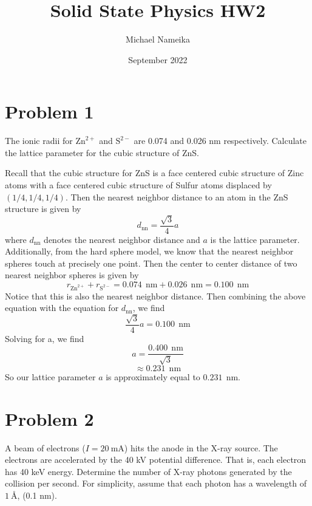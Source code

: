 \documentclass{article}
\title{Solid State Physics HW2}
\author{Michael Nameika}
\date{September 2022}
\begin{document}
\maketitle

\section*{Problem 1}


The ionic radii for $\text{Zn}^{2+}$ and $\text{S}^{2-}$ are 0.074 and 0.026 nm respectively. Calculate the lattice parameter for the cubic structure of ZnS. 
\newline\newline

Recall that the cubic structure for ZnS is a face centered cubic structure of Zinc atoms with a face centered cubic structure of Sulfur atoms displaced by $(1/4,1/4,1/4)$. Then the nearest neighbor distance to an atom in the ZnS structure is given by 
\[d_{\text{nn}} = \frac{\sqrt{3}}{4}a\]
where $d_{\text{nn}}$ denotes the nearest neighbor distance and $a$ is the lattice parameter. Additionally, from the hard sphere model, we know that the nearest neighbor spheres touch at precisely one point. Then the center to center distance of two nearest neighbor spheres is given by
\[r_{\text{Zn}^{2+}} + r_{\text{S}^{2-}} = 0.074 \:\:\text{nm} + 0.026 \:\:\text{nm} = 0.100 \:\:\text{nm}\]
Notice that this is also the nearest neighbor distance. Then combining the above equation with the equation for $d_{\text{nn}}$, we find
\[\frac{\sqrt{3}}{4}a = 0.100 \:\: \text{nm}\]
Solving for a, we find
\[a = \frac{0.400 \:\: \text{nm}}{\sqrt{3}}\]
\[ \approx 0.231 \:\: \text{nm}\]
So our lattice parameter $a$ is approximately equal to $0.231 \:\: \text{nm}$.
\newline\newline

\section*{Problem  2}


A beam of electrons ($I = 20 \: \text{mA}$) hits the anode in the X-ray source. The electrons are accelerated by the 40 kV potential difference. That is, each electron has 40 keV energy. Determine the number of X-ray photons generated by the collision per second. For simplicity, assume that each photon has a wavelength of $1 \: \text{\AA}$, (0.1 nm).
\newline
\end{document}
